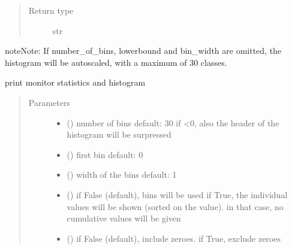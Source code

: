 \documentclass[letterpaper,10pt,english]{sphinxmanual}
\begin{document}
\begin{fulllineitems}
\begin{fulllineitems}
\begin{quote}
\begin{description}
\item[{Return type}] \leavevmode
str

\end{description}\end{quote}

\begin{sphinxadmonition}{note}{Note:}
If number\_of\_bins, lowerbound and bin\_width are omitted, the histogram will be autoscaled,
with a maximum of 30 classes.
\end{sphinxadmonition}

\end{fulllineitems}


\begin{fulllineitems}
\label{\detokenize{Reference:salabim.Monitor.print_histograms}}
print monitor statistics and histogram
\begin{quote}\begin{description}
\item[{Parameters}] \leavevmode\begin{itemize}
\item {} 
 () \textendash{} number of bins 
default: 30 
if \textless{}0, also the header of the histogram will be surpressed

\item {} 
 () \textendash{} first bin 
default: 0

\item {} 
 () \textendash{} width of the bins 
default: 1

\item {} 
 () \textendash{} if False (default), bins will be used 
if True, the individual values will be shown (sorted on the value).
in that case, no cumulative values will be given 

\item {} 
 () \textendash{} if False (default), include zeroes. if True, exclude zeroes


\end{itemize}
\end{description}
\end{quote}
\end{fulllineitems}
\end{fulllineitems}
\end{document}
